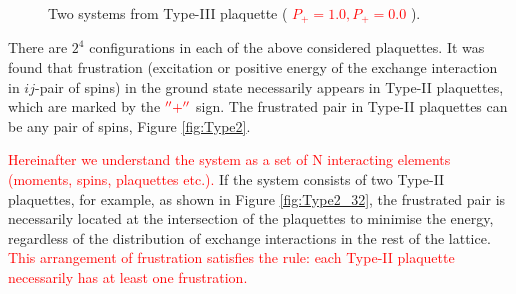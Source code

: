 \documentclass[preprint,12pt]{elsarticle}
\begin{document}
\begin{figure}[H]
\begin{minipage}[t]{0.3\textwidth}
			\caption{Two systems from Type-III plaquette (\textcolor{red}{  $P_+=1.0, P_+=0.0$ }).}
			\label{fig:Type3}
		\end{minipage}
	\end{figure}
	
	
	There are $2^4$ configurations in each of the above considered plaquettes.
	It was found that frustration (excitation or positive energy of the exchange interaction in $ij$-pair of spins) in the ground state necessarily appears in Type-II plaquettes, which are marked by the $\textcolor{red}{''+''}$ sign. The frustrated pair in Type-II plaquettes can be any pair of spins, Figure \ref{fig:Type2}.
	
	\textcolor{red}{Hereinafter we understand the system as a set of N interacting elements (moments, spins, plaquettes etc.).} If the system consists of two Type-II plaquettes, for example, as shown in Figure \ref{fig:Type2_32}, the frustrated pair is necessarily located at the intersection of the plaquettes to minimise the energy, regardless of the distribution of exchange interactions in the rest of the lattice. \textcolor{red}{This arrangement of frustration satisfies the rule: each Type-II plaquette necessarily has at least one frustration.}
	
\end{document}
